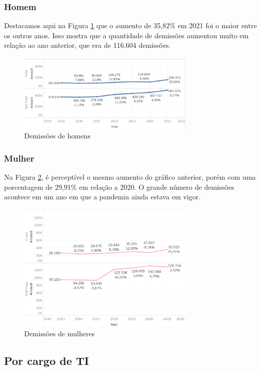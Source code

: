 \subsubsection{Homem}

Destacamos aqui na Figura \ref{fig_4_qnt_h_demit} que o aumento de 35,82\% em 2021 foi o maior entre os outros anos. Isso mostra que a quantidade de demissões aumentou muito em relação ao ano anterior, que era de 116.604 demissões. 

\begin{figure}[htbp]
	\centerline{
		\includegraphics[width=85mm]{assets/4_qnt_h_demit.PNG}
	}
	\caption{Demissões de homens}
	\label{fig_4_qnt_h_demit}
\end{figure}

\subsubsection{Mulher}

Na Figura \ref{fig_4_qnt_m_demit}, é perceptível o mesmo aumento do gráfico anterior, porém com uma porcentagem de 29,91\% em relação a 2020. O grande número de demissões acontece em um ano em que a pandemia ainda estava em vigor. 

\begin{figure}[htbp]
	\centerline{
		\includegraphics[width=85mm]{assets/4_qnt_m_demit.PNG}
	}
	\caption{Demissões de mulheres}
	\label{fig_4_qnt_m_demit}
\end{figure}

\subsection{Por cargo de TI}

